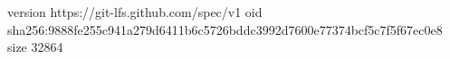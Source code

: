 version https://git-lfs.github.com/spec/v1
oid sha256:9888fe255c941a279d6411b6c5726bddc3992d7600e77374bcf5c7f5f67ec0e8
size 32864
